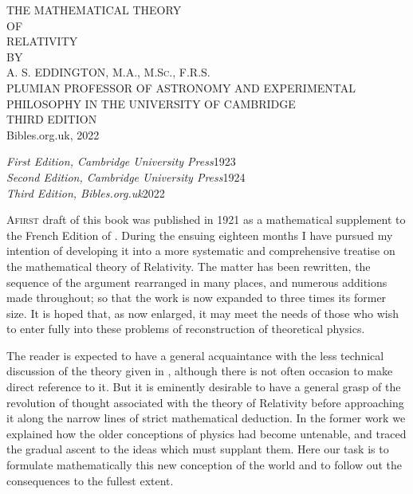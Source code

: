 \documentclass[12pt]{book}
\begin{document}
\FrontMatter

\thispagestyle{empty}
\vspace*{1ex}
\begin{center}
\parttitlefont
\LARGE THE MATHEMATICAL THEORY\\
\medskip
\large OF\\
\medskip
\LARGE RELATIVITY\\
\bigskip
\titlefont
\normalsize BY \\
\Large A. S. EDDINGTON, M.A., \textsc{M.Sc.}, F.R.S.\\
\medskip
\scriptsize PLUMIAN PROFESSOR OF ASTRONOMY AND EXPERIMENTAL\\
PHILOSOPHY IN THE UNIVERSITY OF CAMBRIDGE\\
\small THIRD EDITION\\
\normalsize Bibles.org.uk, 2022\\
\end{center}
\newpage\thispagestyle{empty}
\hfill
\parbox{8.5cm}{%
\begin{center}
\textit{First Edition, Cambridge University Press}\hfill1923\\
\medskip
\textit{Second Edition, Cambridge University Press}\hfill1924\\
\medskip
\textit{Third Edition, Bibles.org.uk}\hfill2022\\
\end{center}
}
\hfill
{}

\Preface

\lettrine{A}{first} draft of this book was published in 1921 as a mathematical supplement
to the French Edition of . During
the ensuing eighteen months I have pursued my intention of developing it
into a more systematic and comprehensive treatise on the mathematical
theory of Relativity. The matter has been rewritten, the sequence of the argument
rearranged in many places, and numerous additions made throughout;
so that the work is now expanded to three times its former size. It is hoped
that, as now enlarged, it may meet the needs of those who wish to enter fully
into these problems of reconstruction of theoretical physics.

The reader is expected to have a general acquaintance with the less
technical discussion of the theory given in ,
although there is not often occasion to make direct reference to it. But it is
eminently desirable to have a general grasp of the revolution of thought
associated with the theory of Relativity before approaching it along the
narrow lines of strict mathematical deduction. In the former work we explained
how the older conceptions of physics had become untenable, and traced
the gradual ascent to the ideas which must supplant them. Here our task is
to formulate mathematically this new conception of the world and to follow
out the consequences to the fullest extent.
\end{document}
